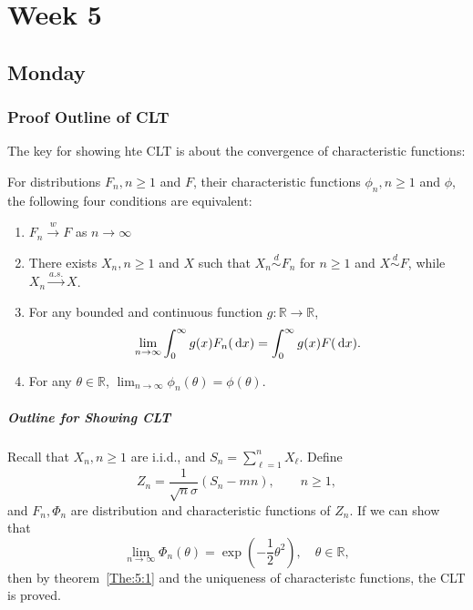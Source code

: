 
\chapter{Week 5}

\section{Monday}

\subsection{Proof Outline of CLT}

The key for showing hte CLT is about the convergence of characteristic functions:

\begin{theorem}\label{The:5:1}
For distributions $F_n,n\ge1$ and $F$, their characteristic functions $\phi_n,n\ge1$ and $\phi$,
the following four conditions are equivalent:
\begin{enumerate}
\item
$F_n\xrightarrow{w}F$ as $n\to\infty$
\item
There exists $X_n,n\ge1$ and $X$ such that $X_n\overset{d}{\sim} F_n$ for $n\ge1$ and $X\overset{d}{\sim} F$,
while $X_n\xrightarrow{a.s.}X$.
\item
For any bounded and continuous function $g: \mathbb{R}\to\mathbb{R}$,
\[
\lim_{n\to\infty}\int_0^\infty g(x)F_n(\,\mathrm{d} x)=\int_0^\infty g(x)F(\,\mathrm{d} x).
\]
\item
For any $\theta\in\mathbb{R}$, $\lim_{n\to\infty}\phi_n(\theta)=\phi(\theta)$.
\end{enumerate}
\end{theorem}

\paragraph{Outline for Showing CLT}
Recall that $X_n,n\ge1$ are i.i.d., and $S_n = \sum_{\ell=1}^nX_\ell$. Define
\[
Z_n = \frac{1}{\sqrt{n}\sigma}(S_n - mn),\qquad n\ge1,
\]
and $F_n,\Phi_n$ are distribution and characteristic functions of $Z_n$.
If we can show that 
\begin{equation}\label{Eq:5:1}
\lim_{n\to\infty}\Phi_n(\theta) = \exp\left(-\frac{1}{2}\theta^2\right),\quad
\theta\in\mathbb{R},
\end{equation}
then by theorem~\ref{The:5:1} and the uniqueness of characteristc functions, 
the CLT is proved.

